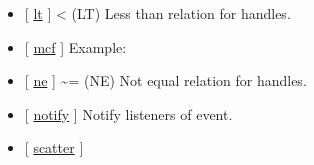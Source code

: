 \documentclass[letterpaper,10pt,english]{sphinxmanual}
\begin{document}
\begin{itemize}
\item {} 
{[} {\hyperref[classes/utils/@mcf/mcf:lt]{lt}} {]}  \textless{} (LT)   Less than relation for handles.

\item {} 
{[} {\hyperref[classes/utils/@mcf/mcf:mcf]{mcf}} {]}   Example:

\item {} 
{[} {\hyperref[classes/utils/@mcf/mcf:ne]{ne}} {]}  \textasciitilde{}= (NE)   Not equal relation for handles.

\item {} 
{[} {\hyperref[classes/utils/@mcf/mcf:notify]{notify}} {]} Notify listeners of event.

\item {} 
{[} {\hyperref[classes/utils/@mcf/mcf:scatter]{scatter}} {]}

\end{itemize}
\end{document}
